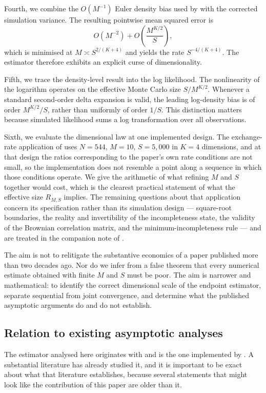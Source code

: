 \documentclass[11pt]{article}
\theoremstyle{definition}
\begin{document}
Fourth, we combine the $O(M^{-1})$ Euler density bias used by \citet{BrandtSantaClara2002} with the corrected simulation variance. The resulting pointwise mean squared error is
\[
O(M^{-2})+O\!\left(\frac{M^{K/2}}{S}\right),
\]
which is minimised at $M\asymp S^{2/(K+4)}$ and yields the rate $S^{-4/(K+4)}$. The estimator therefore exhibits an explicit curse of dimensionality.

Fifth, we trace the density-level result into the log likelihood. The nonlinearity of the logarithm operates on the effective Monte Carlo size $S/M^{K/2}$. Whenever a standard second-order delta expansion is valid, the leading log-density bias is of order $M^{K/2}/S$, rather than uniformly of order $1/S$. This distinction matters because simulated likelihood sums a log transformation over all observations.

Sixth, we evaluate the dimensional law at one implemented design. The exchange-rate application of \citet{BrandtSantaClara2002} uses $N=544$, $M=10$, $S=5{,}000$ in $K=4$ dimensions, and at that design the ratios corresponding to the paper's own rate conditions are not small, so the implementation does not resemble a point along a sequence in which those conditions operate. We give the arithmetic of what refining $M$ and $S$ together would cost, which is the clearest practical statement of what the effective size $R_{M,S}$ implies. The remaining questions about that application concern its specification rather than its simulation design --- square-root boundaries, the reality and invertibility of the incompleteness state, the validity of the Brownian correlation matrix, and the minimum-incompleteness rule --- and are treated in the companion note of .

The aim is not to relitigate the substantive economics of a paper published more than two decades ago. Nor do we infer from a false theorem that every numerical estimate obtained with finite $M$ and $S$ must be poor. The aim is narrower and mathematical: to identify the correct dimensional scale of the endpoint estimator, separate sequential from joint convergence, and determine what the published asymptotic arguments do and do not establish.

\subsection{Relation to existing asymptotic analyses}\label{sec:related}

The estimator analysed here originates with \citet{Pedersen1995a,Pedersen1995b} and is the one implemented by \citet{BrandtSantaClara2002}. A substantial literature has already studied it, and it is important to be exact about what that literature establishes, because several statements that might look like the contribution of this paper are older than it.
\end{document}
